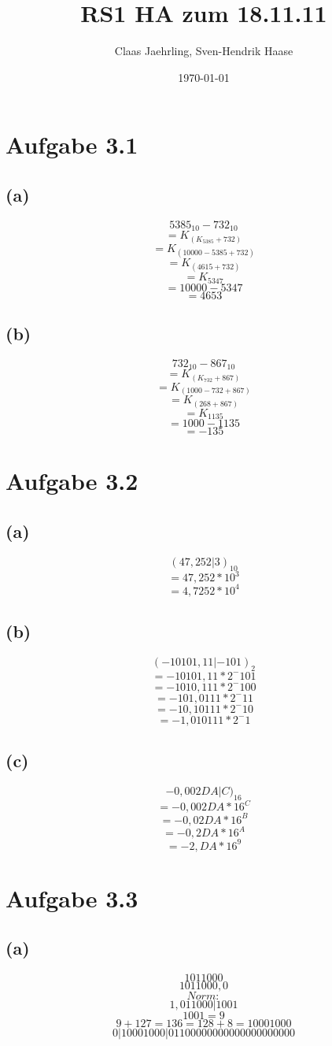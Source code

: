 \documentclass[12pt]{article}
\author{Claas Jaehrling, Sven-Hendrik Haase}
\title{RS1 HA zum 18.11.11}
\date{\today}
\begin{document}
\maketitle

\section{Aufgabe 3.1}
\subsection{(a)}
\[5385_{10} - 732_{10}\]
\[= K_(K_5385 + 732)\]
\[= K_(10000-5385 + 732)\]
\[= K_(4615 + 732)\]
\[= K_5347\]
\[= 10000-5347\]
\[= 4653\]
\subsection{(b)}
\[732_{10} - 867_{10}\]
\[= K_(K_732 + 867)\]
\[= K_(1000-732 + 867)\]
\[= K_(268 + 867)\]
\[= K_1135\]
\[= 1000-1135\]
\[= -135\]

\section{Aufgabe 3.2}
\subsection{(a)}
\[(47,252|3)_{10}\]
\[= 47,252 * 10^3\]
\[= 4,7252 * 10^4\]
\subsection{(b)}
\[(-10101,11|-101)_2\]
\[= -10101,11 * 2^-101\]
\[= -1010,111 * 2^-100\]
\[= -101,0111 * 2^-11\]
\[= -10,10111 * 2^-10\]
\[= -1,010111 * 2^-1\]
\subsection{(c)}
\[-0,002DA|C)_{16}\]
\[= -0,002DA * 16^C\]
\[= -0,02DA * 16^B\]
\[= -0,2DA * 16^A\]
\[= -2,DA * 16^9\]

\section{Aufgabe 3.3}
\subsection{(a)}
\[101 1000\]
\[1011000,0\]
\[Norm:\]
\[1,011000 | 1001\]
\[1001 = 9\]
\[9 + 127 = 136 = 128 + 8 = 10001000\]
\[0 | 10001000 | 01100000000000000000000\]
\end{document}

